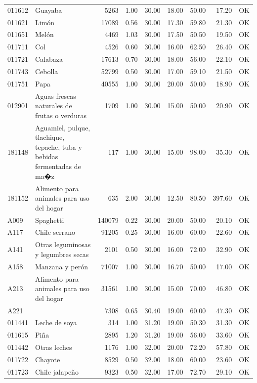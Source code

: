 \begin{table}[ht]
\begin{tabular}{llrrrrrrl}
  011612 & Guayaba & 5263 & 1.00 & 30.00 & 18.00 & 50.00 & 17.20 & OK \\ 
  011621 & Limón & 17089 & 0.56 & 30.00 & 17.30 & 59.80 & 21.30 & OK \\ 
  011651 & Melón & 4469 & 1.03 & 30.00 & 17.50 & 50.50 & 19.50 & OK \\ 
  011711 & Col & 4526 & 0.60 & 30.00 & 16.00 & 62.50 & 26.40 & OK \\ 
  011721 & Calabaza & 17613 & 0.70 & 30.00 & 18.00 & 56.00 & 22.10 & OK \\ 
  011743 & Cebolla & 52799 & 0.50 & 30.00 & 17.00 & 59.10 & 21.50 & OK \\ 
  011751 & Papa & 40555 & 1.00 & 30.00 & 20.00 & 50.00 & 18.90 & OK \\ 
  012901 & Aguas frescas naturales de frutas o verduras & 1709 & 1.00 & 30.00 & 15.00 & 50.00 & 20.90 & OK \\ 
  181148 & Aguamiel, pulque, tlachique, tepache, tuba y bebidas fermentadas de ma�z & 117 & 1.00 & 30.00 & 15.00 & 98.00 & 35.30 & OK \\ 
  181152 & Alimento para animales para uso del hogar & 635 & 2.00 & 30.00 & 12.50 & 80.50 & 397.60 & OK \\ 
  A009 & Spaghetti & 140079 & 0.22 & 30.00 & 20.00 & 50.00 & 20.10 & OK \\ 
  A117 & Chile serrano & 91205 & 0.25 & 30.00 & 16.00 & 60.00 & 22.60 & OK \\ 
  A141 & Otras leguminosas y legumbres secas & 2101 & 0.50 & 30.00 & 16.00 & 72.00 & 32.90 & OK \\ 
  A158 & Manzana y perón & 71007 & 1.00 & 30.00 & 16.70 & 50.00 & 17.00 & OK \\ 
  A213 & Alimento para animales para uso del hogar & 31561 & 1.00 & 30.00 & 15.00 & 70.00 & 46.80 & OK \\ 
  A221 &  & 7308 & 0.65 & 30.40 & 19.00 & 60.00 & 47.30 & OK \\ 
  011441 & Leche de soya & 314 & 1.00 & 31.20 & 19.00 & 50.30 & 31.30 & OK \\ 
  011615 & Piña & 2895 & 1.20 & 31.20 & 19.00 & 56.00 & 33.60 & OK \\ 
  011442 & Otras leches & 1176 & 1.00 & 32.00 & 20.00 & 72.20 & 57.80 & OK \\ 
  011722 & Chayote & 8529 & 0.50 & 32.00 & 18.00 & 60.00 & 23.60 & OK \\ 
  011723 & Chile jalapeño & 9323 & 0.50 & 32.00 & 17.00 & 72.70 & 29.10 & OK \\ 

\end{tabular}
\end{table}
